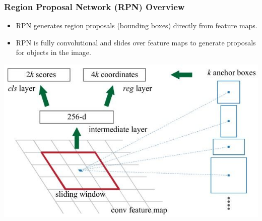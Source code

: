 \documentclass{beamer}
\begin{document}
\begin{frame}
    \frametitle{Region Proposal Network (RPN) Overview}

    \begin{itemize}
        \item RPN generates region proposals (bounding boxes) directly from feature maps.
        \item RPN is fully convolutional and slides over feature maps to generate proposals for objects in the image.
    \end{itemize}
   
    \centering
    \includegraphics[width=0.8\linewidth]{slide14.jpg}

\end{frame}
\end{document}
